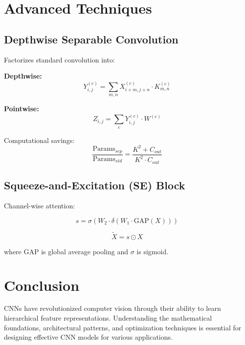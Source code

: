\documentclass[12pt,a4paper]{article}
\begin{document}
\section{Advanced Techniques}

\subsection{Depthwise Separable Convolution}

Factorizes standard convolution into:

\textbf{Depthwise:}
\begin{equation}
Y^{(c)}_{i,j} = \sum_{m,n} X^{(c)}_{i+m,j+n} \cdot K^{(c)}_{m,n}
\end{equation}

\textbf{Pointwise:}
\begin{equation}
Z_{i,j} = \sum_c Y^{(c)}_{i,j} \cdot W^{(c)}
\end{equation}

Computational savings:
\begin{equation}
\frac{\text{Params}_{sep}}{\text{Params}_{std}} = \frac{K^2 + C_{out}}{K^2 \cdot C_{out}}
\end{equation}

\subsection{Squeeze-and-Excitation (SE) Block}

Channel-wise attention:

\begin{equation}
s = \sigma(W_2 \cdot \delta(W_1 \cdot \text{GAP}(X)))
\end{equation}

\begin{equation}
\tilde{X} = s \odot X
\end{equation}

where GAP is global average pooling and $\sigma$ is sigmoid.

\section{Conclusion}

CNNs have revolutionized computer vision through their ability to learn hierarchical feature representations. Understanding the mathematical foundations, architectural patterns, and optimization techniques is essential for designing effective CNN models for various applications.
\end{document}
